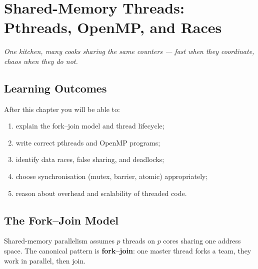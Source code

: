\chapter{Shared-Memory Threads: Pthreads, OpenMP, and Races}\label{ch:threads}
\begin{center}\small\textit{One kitchen, many cooks sharing the same counters --- fast when they coordinate, chaos when they do not.}\end{center}

\noindent{}
\vspace{0.4em}

\section*{Learning Outcomes}
After this chapter you will be able to:
\begin{enumerate}[label=(L\arabic*)]
  \item explain the fork--join model and thread lifecycle;
  \item write correct pthreads and OpenMP programs;
  \item identify data races, false sharing, and deadlocks;
  \item choose synchronisation (mutex, barrier, atomic) appropriately;
  \item reason about overhead and scalability of threaded code.
\end{enumerate}

\section{The Fork--Join Model}
Shared-memory parallelism assumes $p$ threads on $p$ cores sharing one address space. The canonical pattern is \textbf{fork--join}: one master thread forks a team, they work in parallel, then join.

